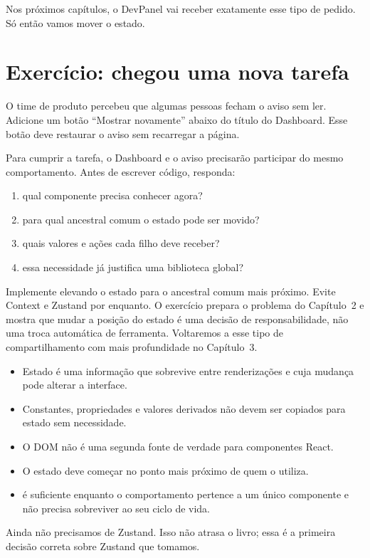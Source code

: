 Nos próximos capítulos, o DevPanel vai receber exatamente esse tipo de pedido.
Só então vamos mover o estado.

\section{Exercício: chegou uma nova tarefa}

\begin{tarefa}
O time de produto percebeu que algumas pessoas fecham o aviso sem ler. Adicione
um botão ``Mostrar novamente'' abaixo do título do Dashboard. Esse botão deve
restaurar o aviso sem recarregar a página.
\end{tarefa}

Para cumprir a tarefa, o Dashboard e o aviso precisarão participar do mesmo
comportamento. Antes de escrever código, responda:

\begin{enumerate}
  \item qual componente precisa conhecer  agora?
  \item para qual ancestral comum o estado pode ser movido?
  \item quais valores e ações cada filho deve receber?
  \item essa necessidade já justifica uma biblioteca global?
\end{enumerate}


Implemente elevando o estado para o ancestral comum mais próximo. Evite Context
e Zustand por enquanto. O exercício prepara o problema do Capítulo~2 e mostra
que mudar a posição do estado é uma decisão de responsabilidade, não uma troca
automática de ferramenta. Voltaremos a esse tipo de compartilhamento com mais
profundidade no Capítulo~3.

\begin{resumo}
\begin{itemize}
  \item Estado é uma informação que sobrevive entre renderizações e cuja mudança
    pode alterar a interface.
  \item Constantes, propriedades e valores derivados não devem ser copiados para
    estado sem necessidade.
  \item O DOM não é uma segunda fonte de verdade para componentes React.
  \item O estado deve começar no ponto mais próximo de quem o utiliza.
  \item {} é suficiente enquanto o comportamento pertence a um
    único componente e não precisa sobreviver ao seu ciclo de vida.
\end{itemize}
\end{resumo}

Ainda não precisamos de Zustand. Isso não atrasa o livro; essa é a primeira
decisão correta sobre Zustand que tomamos.
